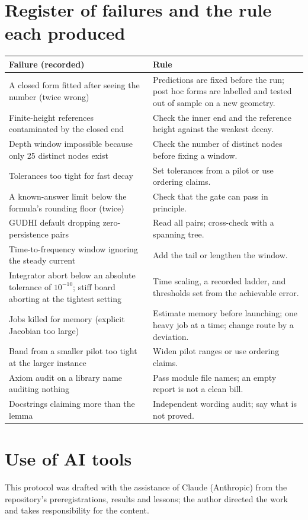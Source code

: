 \documentclass[11pt,a4paper]{article}
\begin{document}
\section{Register of failures and the rule each produced}
\begin{center}\small\begin{tabular}{p{6.4cm}p{7.4cm}}\toprule
Failure (recorded) & Rule \\ \midrule
A closed form fitted after seeing the number (twice wrong) & Predictions are fixed before the run; post hoc forms are labelled and tested out of sample on a new geometry. \\
Finite-height references contaminated by the closed end & Check the inner end and the reference height against the weakest decay. \\
Depth window impossible because only 25 distinct nodes exist & Check the number of distinct nodes before fixing a window. \\
Tolerances too tight for fast decay & Set tolerances from a pilot or use ordering claims. \\
A known-answer limit below the formula's rounding floor (twice) & Check that the gate can pass in principle. \\
GUDHI default dropping zero-persistence pairs & Read all pairs; cross-check with a spanning tree. \\
Time-to-frequency window ignoring the steady current & Add the tail or lengthen the window. \\
Integrator abort below an absolute tolerance of $10^{-10}$; stiff board aborting at the tightest setting & Time scaling, a recorded ladder, and thresholds set from the achievable error. \\
Jobs killed for memory (explicit Jacobian too large) & Estimate memory before launching; one heavy job at a time; change route by a deviation. \\
Band from a smaller pilot too tight at the larger instance & Widen pilot ranges or use ordering claims. \\
Axiom audit on a library name auditing nothing & Pass module file names; an empty report is not a clean bill. \\
Docstrings claiming more than the lemma & Independent wording audit; say what is not proved. \\ \bottomrule
\end{tabular}\end{center}

\section*{Use of AI tools}
This protocol was drafted with the assistance of Claude (Anthropic) from the repository's preregistrations, results and lessons; the author directed the work and takes responsibility for the content.
\end{document}
